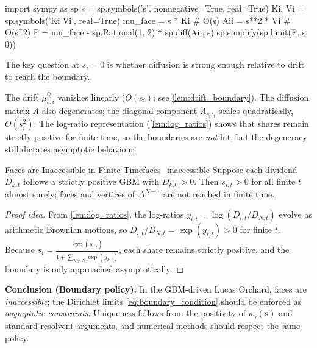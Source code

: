 \documentclass[11pt,letterpaper,oneside]{article}
\numberwithin{equation}{section}
\newenvironment{pyconsole}{\verbatim}{\endverbatim}
\newenvironment{pyconsole}{\verbatim}{\endverbatim}
\newcommand{\1}{\mathbf{1}}
\begin{document}
\begin{tcolorbox}[didacticstyle]
\begin{tcolorbox}[mathstyle]
\begin{sympycheck}[title={Fichera quantity $\mathfrak{F}_i$ vanishes on $s_i=0$}]
\begin{pyconsole}
import sympy as sp
s = sp.symbols('s', nonnegative=True, real=True)
Ki, Vi = sp.symbols('Ki Vi', real=True)
mu_face = s * Ki              # O(s)
Aii = s**2 * Vi               # O(s^2)
F = mu_face - sp.Rational(1, 2) * sp.diff(Aii, s)
sp.simplify(sp.limit(F, s, 0))
\end{pyconsole}
\end{sympycheck}

\begin{tcolorbox}[didacticstyle,title={Intuition: Attainability of Boundaries}]
  The key question at $s_i=0$ is whether diffusion is strong enough relative to drift to reach the boundary.

  The drift $\mu_{s,i}^{\mathbb{Q}}$ vanishes linearly ($O(s_i)$; see \cref{lem:drift_boundary}). The diffusion matrix $A$ also degenerates; the diagonal component $A_{s_i s_i}$ scales quadratically, $O(s_i^2)$. The log-ratio representation (\cref{lem:log_ratios}) shows that shares remain strictly positive for finite time, so the boundaries are \emph{not} hit, but the degeneracy still dictates asymptotic behaviour.
\end{tcolorbox}

    \begin{proposition}{Faces are Inaccessible in Finite Time}{faces_inaccessible}
    Suppose each dividend $D_{k,t}$ follows a strictly positive GBM with $D_{k,0}>0$. Then $s_{i,t}>0$ for all finite $t$ almost surely; faces and vertices of $\Delta^{N-1}$ are not reached in finite time.
    \end{proposition}
  \begin{proof}[Proof idea]
  From \cref{lem:log_ratios}, the log-ratios $y_{i,t} = \log(D_{i,t}/D_{N,t})$ evolve as arithmetic Brownian motions, so $D_{i,t}/D_{N,t} = \exp(y_{i,t}) > 0$ for finite $t$. Because $s_i = \frac{\exp(y_{i,t})}{1 + \sum_{k\neq N} \exp(y_{k,t})}$, each share remains strictly positive, and the boundary is only approached asymptotically.
  \end{proof}

  	\textbf{Conclusion (Boundary policy).} In the GBM-driven Lucas Orchard, faces are \emph{inaccessible}; the Dirichlet limits \eqref{eq:boundary_condition} should be enforced as \emph{asymptotic constraints}. Uniqueness follows from the positivity of $\kappa_\gamma(\bm{s})$ and standard resolvent arguments, and numerical methods should respect the same policy.
\end{tcolorbox}


\end{tcolorbox}
\end{document}

